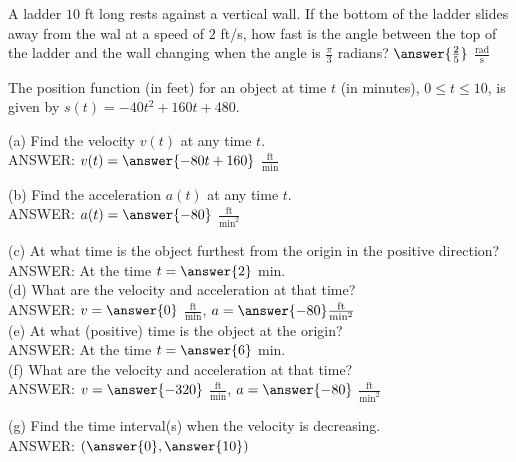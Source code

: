 \documentclass{ximera}
\begin{document}
\begin{exercise}
A ladder $10$ ft long rests against a vertical wall. If the bottom of the ladder slides away from the wal at a speed of $2$ ft/s, how fast is the angle between the top of the ladder and the wall changing when the angle is $\frac{\pi}{3}$ radians?  $\answer{\frac{2}{5}}$ $\frac{\text{rad}}{\text{s}}$
\end{exercise}

\begin{exercise}
The position function (in feet) for an object at time $t$ (in minutes), $0\leq t\leq 10$, is given by $s(t)=-40t^2+160t+480$.

(a) Find the velocity $v(t)$ at any time $t$.\\

ANSWER: $v(t)=\answer{-80t+160}$ $\frac{\text{ft}}{\text{min}}$

(b) Find the acceleration $a(t)$ at any time $t$.\\

ANSWER: $a(t)=\answer{-80}$ $\frac{\text{ft}}{\text{min}^2}$

(c) At what time is the object furthest from the origin in the positive direction?\\

ANSWER: At the time $t=\answer{2}$ min.\\

(d) What are the velocity and acceleration at that time?\\

ANSWER:  $v=\answer{0}$ $\frac{\text{ft}}{\text{min}}$, $a=\answer{-80} \frac{\text{ft}}{\text{min}^2}$\\

(e) At what (positive) time is the object at the origin?\\

ANSWER: At the time  $t=\answer{6}$ min.\\

(f) What are the velocity and acceleration at that time?\\

ANSWER: $v=\answer{-320}$ $\frac{\text{ft}}{\text{min}}$, $a=\answer{-80}$ $\frac{\text{ft}}{\text{min}^2}$

(g) Find the time interval(s) when the velocity is decreasing.\\

ANSWER:  $(\answer{0},\answer{10})$\\
\end{exercise}
\end{document}
